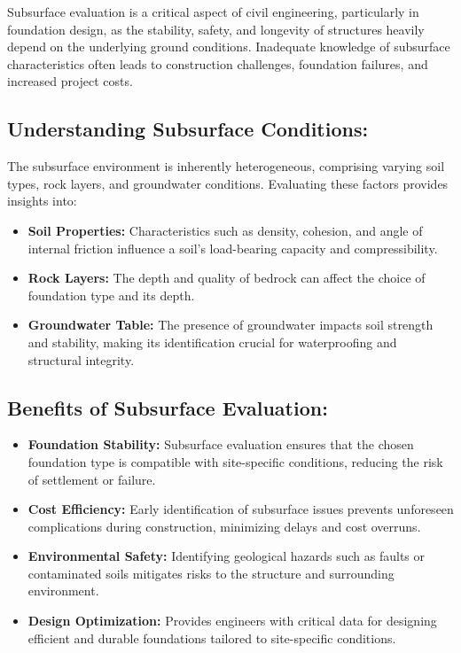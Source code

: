 \documentclass[12pt,a4paper]{report}
\begin{document}
Subsurface evaluation is a critical aspect of civil engineering, particularly in foundation design, as the stability, safety, and longevity of structures heavily depend on the underlying ground conditions. Inadequate knowledge of subsurface characteristics often leads to construction challenges, foundation failures, and increased project costs.

\subsection{Understanding Subsurface Conditions:}
The subsurface environment is inherently heterogeneous, comprising varying soil types, rock layers, and groundwater conditions. Evaluating these factors provides insights into:

\begin{itemize}
    \item \textbf{Soil Properties:} Characteristics such as density, cohesion, and angle of internal friction influence a soil's load-bearing capacity and compressibility.
    \item \textbf{Rock Layers:} The depth and quality of bedrock can affect the choice of foundation type and its depth.
    \item \textbf{Groundwater Table:} The presence of groundwater impacts soil strength and stability, making its identification crucial for waterproofing and structural integrity.
\end{itemize}

\subsection{Benefits of Subsurface Evaluation:}
\begin{itemize}
    \item \textbf{Foundation Stability:} Subsurface evaluation ensures that the chosen foundation type is compatible with site-specific conditions, reducing the risk of settlement or failure.
    \item \textbf{Cost Efficiency:} Early identification of subsurface issues prevents unforeseen complications during construction, minimizing delays and cost overruns.
    \item \textbf{Environmental Safety:} Identifying geological hazards such as faults or contaminated soils mitigates risks to the structure and surrounding environment.
    \item \textbf{Design Optimization:} Provides engineers with critical data for designing efficient and durable foundations tailored to site-specific conditions.
\end{itemize}
\end{document}
